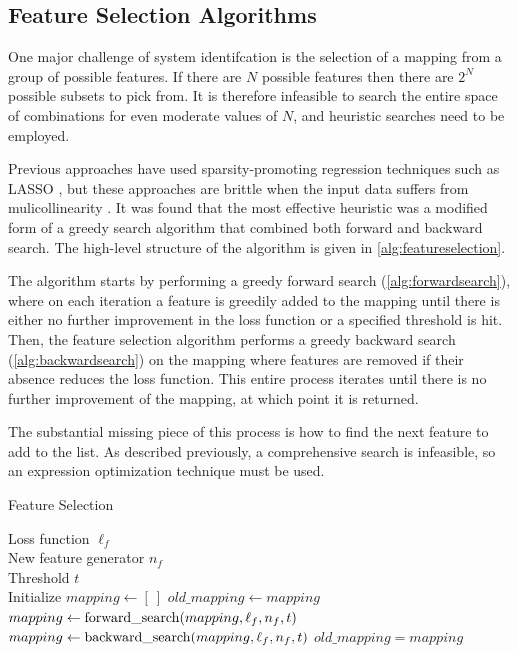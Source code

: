 \documentclass{article}
\begin{document}
\subsection{Feature Selection Algorithms}

One major challenge of system identifcation is the selection of a mapping from a group of possible features. If there are $N$ possible features then there are $2^N$ possible subsets to pick from. It is therefore infeasible to search the entire space of combinations for even moderate values of $N$, and heuristic searches need to be employed. 

Previous approaches have used sparsity-promoting regression techniques such as LASSO \cite{tibshirani1996regression}, but these approaches are brittle when the input data suffers from mulicollinearity \cite{rudy2017data}. It was found that the most effective heuristic was a modified form of a greedy search algorithm that combined both forward and backward search. The high-level structure of the algorithm is given in \cref{alg:featureselection}.

The algorithm starts by performing a greedy forward search (\cref{alg:forwardsearch}), where on each iteration a feature is greedily added to the mapping until there is either no further improvement in the loss function or a specified threshold is hit. Then, the feature selection algorithm performs a greedy backward search (\cref{alg:backwardsearch}) on the mapping where features are removed if their absence reduces the loss function. This entire process iterates until there is no further improvement of the mapping, at which point it is returned.

The substantial missing piece of this process is how to find the next feature to add to the list. As described previously, a comprehensive search is infeasible, so an expression optimization technique must be used.


\begin{algorithm}[tb]
   \caption{Feature Selection}
   \label{alg:featureselection}
\begin{algorithmic}
    Loss function $\ell_f$ \\
   \quad \quad \quad New feature generator $n_f$ \\
   \quad \quad \quad Threshold $t$ \\
   \STATE Initialize $mapping \gets [ \ ]$
   \REPEAT
   \STATE $old\_mapping \gets mapping$
   \STATE $mapping \gets {\rm forward\_search}(mapping, \ell_f, n_f, t)$
   \STATE $mapping \gets {\rm backward\_search}(mapping, \ell_f, n_f, t)$
   \UNTIL $old\_mapping = mapping$
\end{algorithmic}
\end{algorithm}
\end{document}
